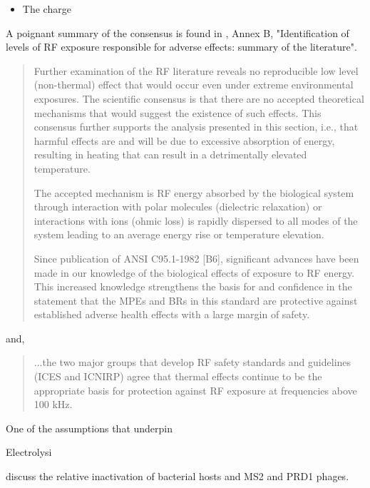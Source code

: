 \documentclass[paper.tex]{subfiles}
\begin{document}
\begin{multicols}{1}
\begin{itemize}
		\item The charge 
\end{itemize}








A poignant summary of the consensus is found in \cite{IEEE2006}, Annex B, "Identification of levels of RF exposure responsible for adverse effects: summary of the literature".

\begin{quote}
	Further examination of the RF literature reveals no reproducible low level (non-thermal) effect that would
	occur even under extreme environmental exposures. The scientific consensus is that there are no accepted
	theoretical mechanisms that would suggest the existence of such effects. This consensus further supports the
	analysis presented in this section, i.e., that harmful effects are and will be due to excessive absorption of
	energy, resulting in heating that can result in a detrimentally elevated temperature. 
	
	The accepted mechanism is RF energy absorbed by the biological system through interaction with polar molecules (dielectric relaxation) or interactions with ions (ohmic loss) is rapidly dispersed to all modes of the system leading to an average energy rise or temperature elevation. 
	
	Since publication of ANSI C95.1-1982 [B6], significant advances have been made in our knowledge of the biological effects of exposure to RF energy. This increased knowledge strengthens the basis for and confidence in the statement that the MPEs and BRs in this	standard are protective against established adverse health effects with a large margin of safety.
\end{quote}

and, 

\begin{quote}
	...the two major groups that develop RF safety standards and
	guidelines (ICES and ICNIRP) agree that thermal effects continue to be the appropriate basis for protection
	against RF exposure at frequencies above 100 kHz.
\end{quote}



One of the assumptions that underpin 



Electrolysi

\cite{comparative2003} discuss the relative inactivation of bacterial hosts and MS2 and PRD1 phages. 


\end{multicols}
\end{document}
